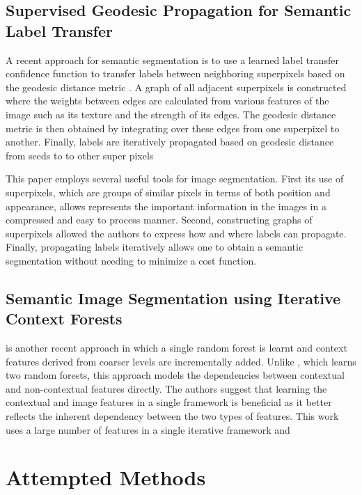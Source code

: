 \documentclass{article} %
\begin{document}
\subsection{Supervised Geodesic Propagation for Semantic Label Transfer}
\label{sec:Geo}

A recent approach for semantic segmentation is to use a learned label transfer confidence function to transfer labels between neighboring superpixels based on the geodesic distance metric \cite{Chen2012}.  A graph of all adjacent superpixels is constructed where the weights between edges are calculated from various features of the image such as its texture and the strength of its edges. The geodesic distance metric is then obtained by integrating over these edges from one superpixel to another. Finally, labels are iteratively propagated based on geodesic distance from seeds to to other super pixels

This paper employs several useful tools for image segmentation. First its use of superpixels, which are groups of similar pixels in terms of both position and appearance, allows represents the important information in the images in a compressed and easy to process manner. Second, constructing graphs of superpixels allowed the authors to express how and where labels can propagate. Finally, propagating labels iteratively allows one to obtain a semantic segmentation without needing to minimize a cost function.

\subsection{Semantic Image Segmentation using Iterative Context Forests}
\label{sec:RandFor}

\cite{} is another recent approach in which a single random forest is learnt and context features derived from coarser levels are incrementally added. Unlike \cite{Shotton06textonboost:joint}, which learns two random forests, this approach models the dependencies between contextual and non-contextual features directly. The authors suggest that learning the contextual and image features in a single framework is beneficial as it better reflects the inherent dependency between the two types of features. This work uses a large number of features in a single iterative framework and 

\section{Attempted Methods}
\label{sec:Attempt}
\end{document}
